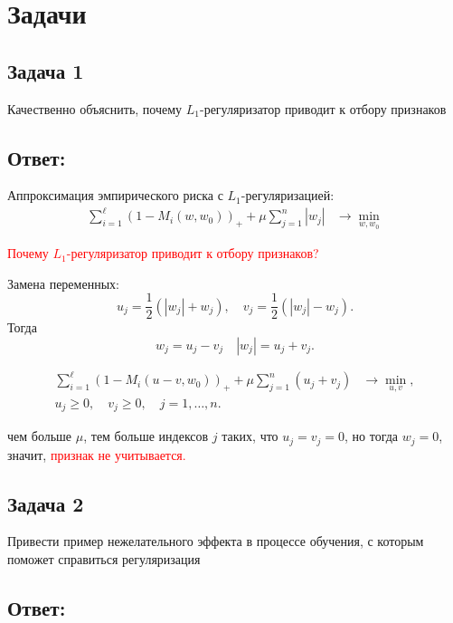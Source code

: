 \section{Задачи}

\subsection{Задача 1}

Качественно объяснить, почему $L_1$-регуляризатор приводит к отбору признаков

\subsection{Ответ:}

Аппроксимация эмпирического риска с \(L_1\)-регуляризацией:
\begin{align*}
    \sum_{i=1}^{\ell} \left(1 - M_i(w, w_0)\right)_+ + \mu \sum_{j=1}^{n} |w_j| & \rightarrow \min_{w, w_0}
\end{align*}

\textcolor{red}{Почему \(L_1\)-регуляризатор приводит к отбору признаков?}

Замена переменных:
\[
    u_j = \frac{1}{2} (|w_j| + w_j), \quad v_j = \frac{1}{2} (|w_j| - w_j).
\]
Тогда
\[
    w_j = u_j - v_j \quad |w_j| = u_j + v_j.
\]

\begin{align*}
    \sum_{i=1}^{\ell} \left(1 - M_i(u - v, w_0)\right)_+ + \mu \sum_{j=1}^{n} (u_j + v_j) & \rightarrow \min_{u, v}, \\
    u_j \geq 0, \quad v_j \geq 0, \quad j = 1, \ldots, n.
\end{align*}

чем больше \(\mu\), тем больше индексов \(j\) таких, что \(u_j = v_j = 0\), но тогда \(w_j = 0\), значит, \textcolor{red}{признак не учитывается.}

\subsection{Задача 2}

Привести пример нежелательного эффекта в процессе обучения, с которым поможет справиться регуляризация

\subsection{Ответ:}

